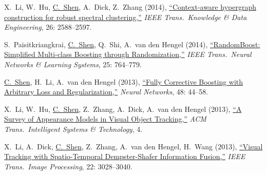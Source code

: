 \documentclass[9pt, a4paper]{article}
\newcommand{\years}[1]{\marginnote{\scriptsize #1}}
\def\highlight{\uline}
\begin{document}
\medskip

\years{2014} X.~Li, W.~Hu, \highlight{C.~Shen}, A.~Dick, Z.~Zhang (2014),
\href{http://www.google.com/search?lr=&ie=UTF-8&oe=UTF-8&q=Context-aware+hypergraph+construction+for+robust+spectral+clustering+Xi+Li%2C+Weiming+Hu%2C+Chunhua+Shen%2C+Anthony+Dick%2C+Zhongfei+Zhang}{``Context-aware hypergraph construction for robust spectral clustering,{}''}
\emph{IEEE Trans.\  Knowledge \& Data Engineering}, 26: 2588--2597.

\medskip

\years{2014} S.~Paisitkriangkrai, \highlight{C.~Shen}, Q.~Shi, A.~van den Hengel (2014),
\href{http://www.google.com/search?lr=&ie=UTF-8&oe=UTF-8&q=RandomBoost%3A+Simplified+Multi-class+Boosting+through+Randomization+Sakrapee+Paisitkriangkrai%2C+Chunhua+Shen%2C+Qinfeng+Shi%2C+Anton+van+den+Hengel}{``{RandomBoost}: {S}implified Multi-class Boosting through Randomization,{}''}
\emph{IEEE Trans.\  Neural Networks \& Learning Systems}, 25: 764--779.

\medskip

\years{2013} \highlight{C.~Shen}, H.~Li, A.~van den Hengel (2013),
\href{http://www.google.com/search?lr=&ie=UTF-8&oe=UTF-8&q=Fully+Corrective+Boosting+with+Arbitrary+Loss+and+Regularization+Chunhua+Shen%2C+Hanxi+Li%2C+Anton+van+den+Hengel}{``Fully Corrective Boosting with Arbitrary Loss and Regularization,{}''}
\emph{Neural Networks}, 48: 44--58.

\medskip

\years{2013} X.~Li, W.~Hu, \highlight{C.~Shen}, Z.~Zhang, A.~Dick, A.~van den Hengel (2013),
\href{http://www.google.com/search?lr=&ie=UTF-8&oe=UTF-8&q=A+Survey+of+Appearance+Models+in+Visual+Object+Tracking+Xi+Li%2C+Weiming+Hu%2C+Chunhua+Shen%2C+Zhongfei+Zhang%2C+Anthony+Dick%2C+Anton+van+den+Hengel}{``A Survey of Appearance Models in Visual Object Tracking,{}''}
\emph{ACM Trans.\  Intelligent Systems \& Technology}, 4.

\medskip

\years{2013} X.~Li, A.~Dick, \highlight{C.~Shen}, Z.~Zhang, A.~van den Hengel, H.~Wang (2013),
\href{http://www.google.com/search?lr=&ie=UTF-8&oe=UTF-8&q=Visual+Tracking+with+Spatio-Temporal+Dempster-Shafer+Information+Fusion+Xi+Li%2C+Anthony+Dick%2C+Chunhua+Shen%2C+Zhongfei%0AZhang%2C+Anton+van+den+Hengel%2C+Hanzi+Wang}{``Visual Tracking with Spatio-Temporal {Dempster-Shafer} Information Fusion,{}''}
\emph{IEEE Trans.\  Image Processing}, 22: 3028--3040.

\medskip
\end{document}
